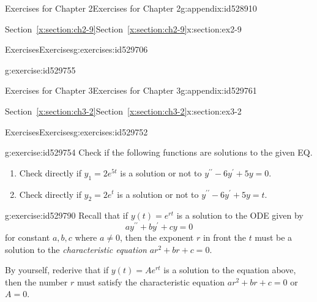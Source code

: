 \documentclass[oneside,10pt,]{book}
\newcommand{\xreffont}{\relax}
\numberwithin{equation}{section}
\numberwithin{equation}{section}
\begin{document}
\begin{appendixptx}{Exercises for Chapter 2}{}{Exercises for Chapter 2}{}{}{g:appendix:id528910}
\begin{sectionptx}{Section~{\xreffont\ref*{x:section:ch2-9}}}{}{Section~{\xreffont\ref*{x:section:ch2-9}}}{}{}{x:section:ex2-9}
\begin{exercises-subsection-numberless}{Exercises}{}{Exercises}{}{}{g:exercises:id529706}
\begin{divisionexercise}{4}{}{}{g:exercise:id529755}
\begin{image}{0}{1}{0}
\end{image}%
%
\end{divisionexercise}%
\end{exercises-subsection-numberless}
\end{sectionptx}
\end{appendixptx}
%
%
\typeout{************************************************}
\typeout{************************************************}
%
\begin{appendixptx}{Exercises for Chapter 3}{}{Exercises for Chapter 3}{}{}{g:appendix:id529761}
%
%
\typeout{************************************************}
\typeout{Section D.1 Section~{\xreffont\ref*{x:section:ch3-2}}}
\typeout{************************************************}
%
\begin{sectionptx}{Section~{\xreffont\ref*{x:section:ch3-2}}}{}{Section~{\xreffont\ref*{x:section:ch3-2}}}{}{}{x:section:ex3-2}
%
%
\typeout{************************************************}
\typeout{************************************************}
%
\begin{exercises-subsection-numberless}{Exercises}{}{Exercises}{}{}{g:exercises:id529752}
\begin{divisionexercise}{1}{}{}{g:exercise:id529754}%
Check if the following functions are solutions to the given EQ.%
\begin{enumerate}[label=(\alph*)]
\item{}Check directly if \(y_{1}=2e^{5t}\) is a solution or not to \(y^{\prime\prime}-6y^{\prime}+5y=0\).%
\item{}Check directly if \(y_{2}=2e^{t}\) is a solution or not to \(y^{\prime\prime}-6y^{\prime}+5y=t\).%
\end{enumerate}
%
\end{divisionexercise}%
\begin{divisionexercise}{2}{}{}{g:exercise:id529790}%
Recall that if \(y(t)=e^{rt}\) is a solution to the ODE given by%
\begin{equation*}
ay^{\prime\prime}+by^{\prime}+cy=0
\end{equation*}
for constant \(a,b,c\) where \(a\ne0\), then the exponent \(r\) in front the \(t\) must be a solution to the \emph{characteristic equation} \(ar^{2}+br+c=0\).%
\par
By yourself, rederive that if \(y(t)=Ae^{rt}\) is a solution to the equation above, then the number \(r\) must satisfy the characteristic equation \(ar^{2}+br+c=0\) or \(A=0\).%

\end{divisionexercise}
\end{exercises-subsection-numberless}
\end{sectionptx}
\end{appendixptx}
\end{document}
